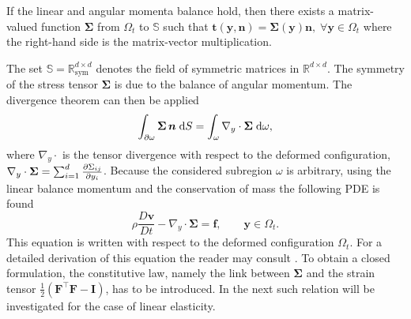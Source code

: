 \begin{theorem}
If the linear and angular momenta balance hold, then there exists a matrix-valued function $\bm{\Sigma}$ from $\Omega_t$ to $\mathbb{S}$ such
that $\bm{t}(\bm{y}, \bm{n}) = \bm{\Sigma}(\bm{y}) \bm{n}, \; \forall \bm{y} \in \Omega_t$ where the right-hand side is the matrix-vector multiplication.
\end{theorem}
The set $\mathbb{S}=\mathbb{R}^{d\times d}_{\mathrm{sym}}$ denotes the field of symmetric matrices in $\mathbb{R}^{d\times d}$. The symmetry of the stress tensor $\bm{\Sigma}$ is due to the balance of angular momentum. The divergence theorem can then be applied
\begin{equation*}
\int_{\partial \omega} \bm{\Sigma} \, \bm{n} \d{S} = \int_{\omega} \nabla_y \cdot\bm{\Sigma} \d{\omega},
\end{equation*}
where $\nabla_y \cdot$ is the tensor divergence with respect to the deformed configuration, $\nabla_y \cdot\bm{\Sigma} = \sum_{i=1}^{d}\diffp{\Sigma_{ij}}{y_i}$.
Because the considered subregion $\omega$ is arbitrary, using the linear balance momentum and the conservation of mass the following PDE is found
\begin{equation*}
	\rho \frac{D\bm{v}}{Dt} - \nabla_y \cdot{\bm{\Sigma}} = \bm{f}, \qquad \bm{y} \in \Omega_t.
\end{equation*}
This equation is written with respect to the deformed configuration $\Omega_t$. For a detailed derivation of this equation the reader may consult \cite[Chapter 4]{abeyaratne2012notes}. To obtain a closed formulation, the constitutive law, namely the link between $\bm{\Sigma}$ and the strain tensor $\frac{1}{2} (\bm{F}^\top \bm{F} - \bm{I})$, has to be introduced. In the next such relation will be investigated for the case of linear elasticity.

